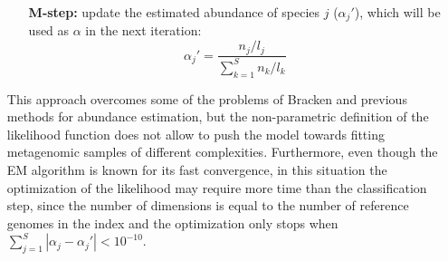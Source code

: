 \begin{itemize}
\begin{itemize}
\begin{equation*}
      \end{equation*}
      \item[\textbf{M-step:}] update the estimated abundance of species $j$ ($\alpha_j'$), which will be used as $\alpha$ in the next iteration:
      \begin{equation*}
        \alpha_j' = \frac{n_j/l_j}{\sum_{k=1}^S n_k/l_k}
      \end{equation*}
    \end{itemize}
    This approach overcomes some of the problems of Bracken and previous methods for abundance estimation, but the non-parametric definition of the likelihood function does not allow to push the model towards fitting metagenomic samples of different complexities. Furthermore, even though the EM algorithm is known for its fast convergence, in this situation the optimization of the likelihood may require more time than the classification step, since the number of dimensions is equal to the number of reference genomes in the index and the optimization only stops when $\sum_{j=1}^S |\alpha_j - \alpha_j'| < 10^{-10}$.
\end{itemize}

